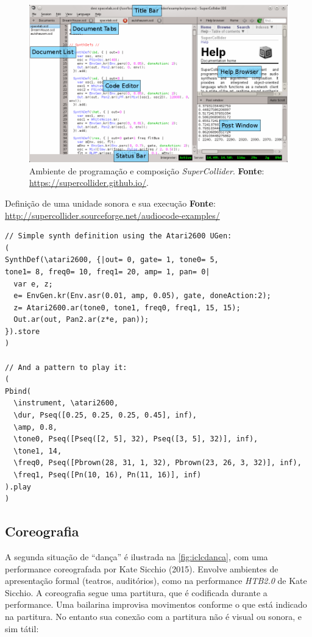 \begin{figure}[!h]
  \centering
  \includegraphics[scale=0.31]{imagens/sc_ide_overview.png}
  \caption{Ambiente de programação e composição \emph{SuperCollider}. \textbf{Fonte}: \url{https://supercollider.github.io/}.}
  \label{fig:sc}
\end{figure}

\begin{example}{Definição de uma unidade sonora e sua execução}
\textbf{Fonte}: \url{http://supercollider.sourceforge.net/audiocode-examples/}

\begin{lstlisting}[style=SuperCollider-IDE]
// Simple synth definition using the Atari2600 UGen:
(
SynthDef(\atari2600, {|out= 0, gate= 1, tone0= 5,
tone1= 8, freq0= 10, freq1= 20, amp= 1, pan= 0|
  var e, z;
  e= EnvGen.kr(Env.asr(0.01, amp, 0.05), gate, doneAction:2);
  z= Atari2600.ar(tone0, tone1, freq0, freq1, 15, 15);
  Out.ar(out, Pan2.ar(z*e, pan));
}).store
)

// And a pattern to play it:
(
Pbind(
  \instrument, \atari2600,
  \dur, Pseq([0.25, 0.25, 0.25, 0.45], inf),
  \amp, 0.8,
  \tone0, Pseq([Pseq([2, 5], 32), Pseq([3, 5], 32)], inf),
  \tone1, 14,
  \freq0, Pseq([Pbrown(28, 31, 1, 32), Pbrown(23, 26, 3, 32)], inf),
  \freq1, Pseq([Pn(10, 16), Pn(11, 16)], inf)
).play
)
\end{lstlisting}
\end{example}\label{ex:artificial}


\subsection{Coreografia}\label{sec:coreografia}

A segunda situação de ``dança'' é ilustrada na \autoref{fig:iclcdanca}, com uma performance coreografada por  Kate Sicchio (2015). Envolve ambientes de apresentação formal (teatros, auditórios), como na performance \emph{HTB2.0} de Kate Sicchio. A coreografia segue uma partitura, que é codificada durante a performance. Uma bailarina improvisa movimentos conforme o que está indicado na partitura. No entanto sua conexão com a partitura não é visual ou sonora, e sim tátil:

